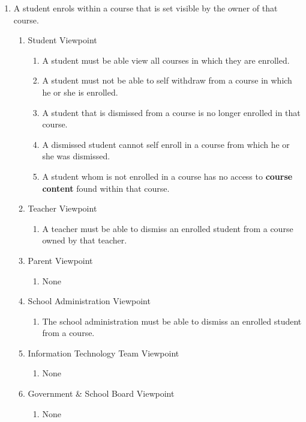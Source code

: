 \documentclass[]{article}
\begin{document}
\begin{enumerate}[{BE}1.]
	\item A student enrols within a course that is set visible by the owner of that course.
	\begin{enumerate}[{VP2}.1]
		\item Student Viewpoint
			\begin{enumerate}
				\item A student must be able view all courses in which they are enrolled.
				\item A student must not be able to self withdraw from a course in which he or she is enrolled.
				\item A student that is dismissed from a course is no longer enrolled in that course.
				\item A dismissed student cannot self enroll in a course from which he or she was dismissed.
				\item A student whom is not enrolled in a course has no access to \textbf{course content} found within that course.
			\end{enumerate}
		\item Teacher Viewpoint
			\begin{enumerate}
				\item A teacher must be able to dismiss an enrolled student from a course owned by that teacher.
			\end{enumerate}
		\item Parent Viewpoint
			\begin{enumerate}
				\item None
			\end{enumerate}
		\item School Administration Viewpoint
			\begin{enumerate}
				\item The school administration must be able to dismiss an enrolled student from a course.
			\end{enumerate}
		\item Information Technology Team Viewpoint
			\begin{enumerate}
				\item None
			\end{enumerate}
		\item Government \& School Board Viewpoint
			\begin{enumerate}
				\item None
			\end{enumerate}
	\end{enumerate}


\end{enumerate}
\end{document}
